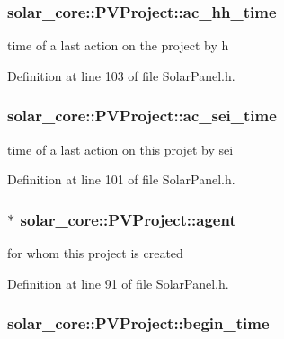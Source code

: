 \subsubsection[{ac\+\_\+hh\+\_\+time}]{ solar\+\_\+core\+::\+P\+V\+Project\+::ac\+\_\+hh\+\_\+time}\label{classsolar__core_1_1_p_v_project_ab6196935ca6f777b28a944642efdbf84}
time of a last action on the project by h 

Definition at line 103 of file Solar\+Panel.\+h.

\hypertarget{classsolar__core_1_1_p_v_project_a0a78a4b527a897aac39e5572fbb5a842}{}
\subsubsection[{ac\+\_\+sei\+\_\+time}]{ solar\+\_\+core\+::\+P\+V\+Project\+::ac\+\_\+sei\+\_\+time}\label{classsolar__core_1_1_p_v_project_a0a78a4b527a897aac39e5572fbb5a842}
time of a last action on this projet by sei 

Definition at line 101 of file Solar\+Panel.\+h.

\hypertarget{classsolar__core_1_1_p_v_project_a20e8115154979d2f856f1acceb6bb2b1}{}
\subsubsection[{agent}]{$\ast$ solar\+\_\+core\+::\+P\+V\+Project\+::agent}\label{classsolar__core_1_1_p_v_project_a20e8115154979d2f856f1acceb6bb2b1}
for whom this project is created 

Definition at line 91 of file Solar\+Panel.\+h.

\hypertarget{classsolar__core_1_1_p_v_project_a5b8869c2a2580e5183a7796580074555}{}
\subsubsection[{begin\+\_\+time}]{ solar\+\_\+core\+::\+P\+V\+Project\+::begin\+\_\+time}\label{classsolar__core_1_1_p_v_project_a5b8869c2a2580e5183a7796580074555}


